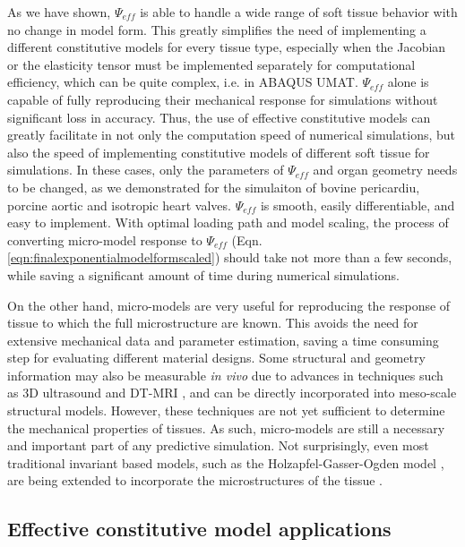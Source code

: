     
    As we have shown, $\Psi_{eff}$ is able to handle a wide range of soft tissue behavior with no change in model form. This greatly simplifies the need of implementing a different constitutive models for every tissue type, especially when the Jacobian or the elasticity tensor must be implemented separately for computational efficiency, which can be quite complex, i.e. in ABAQUS UMAT. $\Psi_{eff}$ alone is capable of fully reproducing their mechanical response for simulations without significant loss in accuracy. Thus, the use of effective constitutive models can greatly facilitate in not only the computation speed of numerical simulations, but also the speed of implementing constitutive models of different soft tissue for simulations. In these cases, only the parameters of $\Psi_{eff}$ and organ geometry needs to be changed, as we demonstrated for the simulaiton of bovine pericardiu, porcine aortic and isotropic heart valves. $\Psi_{eff}$ is smooth, easily differentiable, and easy to implement. With optimal loading path and model scaling, the process of converting micro-model response to $\Psi_{eff}$ (Eqn. \ref{eqn:finalexponentialmodelformscaled}) should take not more than a few seconds, while saving a significant amount of time during numerical simulations. 
    
    
    On the other hand, micro-models are very useful for reproducing the response of tissue to which the full microstructure are known. This avoids the need for extensive mechanical data and parameter estimation, saving a time consuming step for evaluating different material designs. Some structural and geometry information may also be measurable \textit{in vivo} due to advances in techniques such as 3D ultrasound \cite{steiner_diagnostic_1994, yang_3d_2008, fenster_3_1996} and DT-MRI \cite{basser_vivo_2000, basser_microstructural_2011}, and can be directly incorporated into meso-scale structural models. However, these techniques are not yet sufficient to determine the mechanical properties of tissues. As such, micro-models are still a necessary and important part of any predictive simulation. Not surprisingly, even most traditional invariant based models, such as the Holzapfel-Gasser-Ogden model \cite{holzapfel_new_2000}, are being extended to incorporate the microstructures of the tissue \cite{holzapfel_modelling_2015}. 
    
    

\subsection{Effective constitutive model applications}

